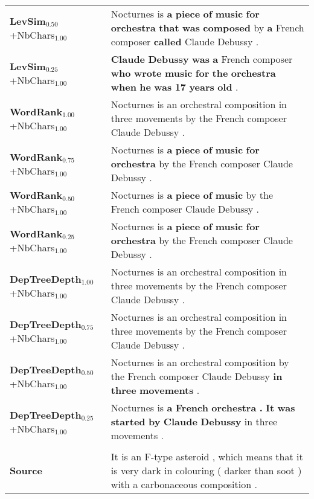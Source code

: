 \documentclass[10pt, a4paper]{article}
\begin{document}
\begin{table*}
{\begin{tabular}{ll}
\textbf{LevSim$_{0.50}$}\footnotesize{+NbChars$_{1.00}$} & Nocturnes is \textbf{a} \textbf{piece} \textbf{of} \textbf{music} \textbf{for} \textbf{orchestra} \textbf{that} \textbf{was} \textbf{composed} by \textbf{a} French composer \textbf{called} Claude Debussy . \\
\textbf{LevSim$_{0.25}$}\footnotesize{+NbChars$_{1.00}$} & \textbf{Claude} \textbf{Debussy} \textbf{was} \textbf{a} French composer \textbf{who} \textbf{wrote} \textbf{music} \textbf{for} \textbf{the} \textbf{orchestra} \textbf{when} \textbf{he} \textbf{was} \textbf{17} \textbf{years} \textbf{old} . \\
\midrule
\textbf{WordRank$_{1.00}$}\footnotesize{+NbChars$_{1.00}$} & Nocturnes is an orchestral composition in three movements by the French composer Claude Debussy . \\
\textbf{WordRank$_{0.75}$}\footnotesize{+NbChars$_{1.00}$} & Nocturnes is \textbf{a} \textbf{piece} \textbf{of} \textbf{music} \textbf{for} \textbf{orchestra} by the French composer Claude Debussy . \\
\textbf{WordRank$_{0.50}$}\footnotesize{+NbChars$_{1.00}$} & Nocturnes is \textbf{a} \textbf{piece} \textbf{of} \textbf{music} by the French composer Claude Debussy . \\
\textbf{WordRank$_{0.25}$}\footnotesize{+NbChars$_{1.00}$} & Nocturnes is \textbf{a} \textbf{piece} \textbf{of} \textbf{music} \textbf{for} \textbf{orchestra} by the French composer Claude Debussy . \\
\midrule
\textbf{DepTreeDepth$_{1.00}$}\footnotesize{+NbChars$_{1.00}$} & Nocturnes is an orchestral composition in three movements by the French composer Claude Debussy . \\
\textbf{DepTreeDepth$_{0.75}$}\footnotesize{+NbChars$_{1.00}$} & Nocturnes is an orchestral composition in three movements by the French composer Claude Debussy . \\
\textbf{DepTreeDepth$_{0.50}$}\footnotesize{+NbChars$_{1.00}$} & Nocturnes is an orchestral composition by the French composer Claude Debussy \textbf{in} \textbf{three} \textbf{movements} . \\
\textbf{DepTreeDepth$_{0.25}$}\footnotesize{+NbChars$_{1.00}$} & Nocturnes is \textbf{a} \textbf{French} \textbf{orchestra} \textbf{.} \textbf{It} \textbf{was} \textbf{started} \textbf{by} \textbf{Claude} \textbf{Debussy} in three movements . \\
\midrule
& \\
\midrule
\textbf{Source} & It is an F-type asteroid , which means that it is very dark in colouring ( darker than soot ) with a carbonaceous composition . \\

\end{tabular}}
\end{table*}
\end{document}
